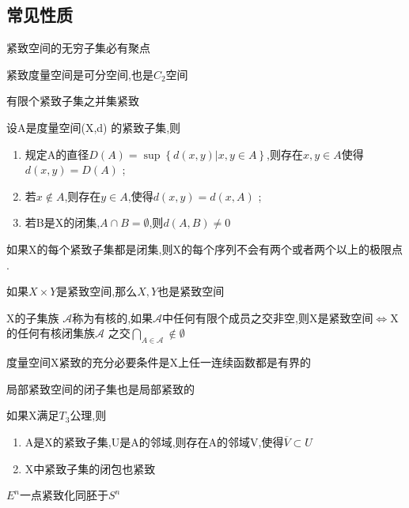 \subsection*{常见性质}
\begin{theorem}
    紧致空间的无穷子集必有聚点
\end{theorem}
\begin{theorem}
    紧致度量空间是可分空间,也是\(C_2\)空间
\end{theorem}
\begin{theorem}
    有限个紧致子集之并集紧致
\end{theorem}
\begin{theorem}
    设A是度量空间(X,d) 的紧致子集,则 \begin{enumerate}
        \item 规定A的直径\(D(A) = \sup \left\{d(x,y) | x,y \in A \right\}\),则存在\(x,y \in A \)使得\(d(x,y) =D(A)\) ;\\
        \item 若\(x \notin A \),则存在\(y \in A \),使得\(d(x,y) =d(x,A)\) ; \\
        \item 若B是X的闭集,\(A \cap B = \emptyset \),则\(d(A,B) \neq 0\)
    \end{enumerate}
\end{theorem}
\begin{theorem}
    如果X的每个紧致子集都是闭集,则X的每个序列不会有两个或者两个以上的极限点 . 
\end{theorem}
\begin{theorem}
    如果\(X \times Y \)是紧致空间,那么\(X ,Y \)也是紧致空间 
\end{theorem}
\begin{theorem}
    X的子集族 \(\mathscr{A}\)称为有核的,如果\(\mathscr{A}\)中任何有限个成员之交非空,则X是紧致空间\(\Leftrightarrow\)X的任何有核闭集族\(\mathscr{A}\) 之交\(\bigcap\limits_{A \in \mathscr{A}} \notin \emptyset\)
\end{theorem}
\begin{theorem}
    度量空间X紧致的充分必要条件是X上任一连续函数都是有界的
\end{theorem}
\begin{theorem}
    局部紧致空间的闭子集也是局部紧致的
\end{theorem}
\begin{theorem}
    如果X满足\(T_3\)公理,则
    \begin{enumerate}
        \item A是X的紧致子集,U是A的邻域,则存在A的邻域V,使得\(\overline{V} \subset U \) \\
        \item X中紧致子集的闭包也紧致
    \end{enumerate}
\end{theorem}
\begin{theorem}
    \(E^n\)一点紧致化同胚于\(S^n\)
\end{theorem}

